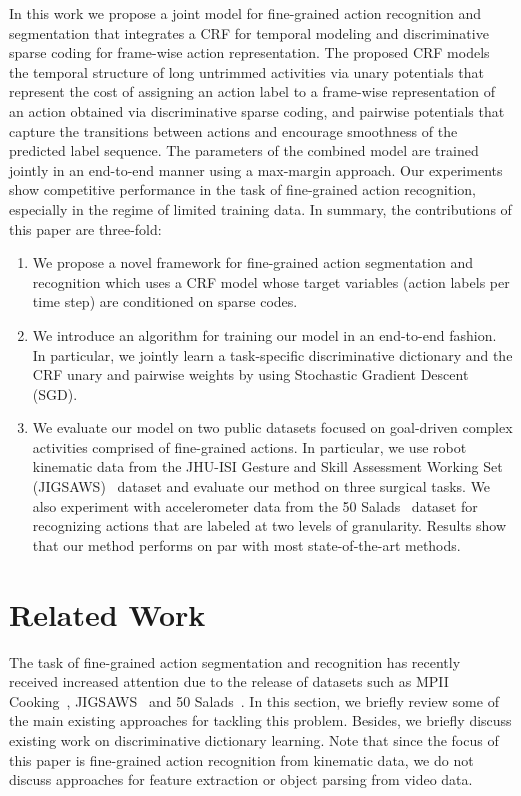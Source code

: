 \documentclass[10pt,twocolumn,letterpaper]{article}
\begin{document}
In this work we propose a joint model for fine-grained action recognition and segmentation that integrates a CRF for temporal modeling and discriminative sparse coding for frame-wise action representation. The proposed CRF models the temporal structure of long untrimmed activities via unary potentials that represent the cost of assigning an action label to a frame-wise representation of an action obtained via discriminative sparse coding, and pairwise potentials that capture the transitions between actions and encourage smoothness of the predicted label sequence. The parameters of the combined model are trained jointly in an end-to-end manner using a max-margin approach. Our experiments show competitive performance in the task of fine-grained action recognition, especially in the regime of limited training data. In summary, the contributions of this paper are three-fold:
\begin{enumerate}
\item We propose a novel framework for fine-grained action segmentation and recognition which uses a CRF model whose target variables (action labels per time step) are conditioned on sparse codes.
\item We introduce an algorithm for training our model in an end-to-end fashion. In particular, we jointly learn a task-specific discriminative dictionary and the CRF unary and pairwise weights by using Stochastic Gradient Descent (SGD).
\item We evaluate our model on two public datasets focused on goal-driven complex activities comprised of fine-grained actions. In particular, we use robot kinematic data from the JHU-ISI Gesture and Skill Assessment Working Set (JIGSAWS)~\cite{Gao2014} dataset and evaluate our method on three surgical tasks. We also experiment with accelerometer data from the 50 Salads~\cite{Stein:UbiComp13} dataset for recognizing actions that are labeled at two levels of granularity. Results show that our method performs on par with most state-of-the-art methods.
\end{enumerate}
\section{Related Work}
The task of fine-grained action segmentation and recognition has recently received increased attention due to the release of datasets such as MPII Cooking~\cite{Rohrbach:CVPR12}, JIGSAWS~\cite{Gao2014} and 50 Salads~\cite{Stein:UbiComp13}. In this section, we briefly review some of the main existing approaches for tackling this problem. Besides, we briefly discuss existing work on discriminative dictionary learning. Note that since the focus of this paper is fine-grained action recognition from kinematic data, we do not discuss approaches for feature extraction or object parsing from video data.
\end{document}
